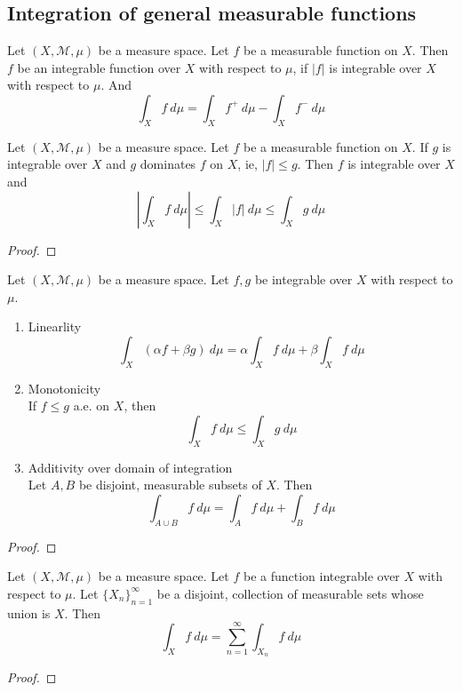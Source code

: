 \subsection{Integration of general measurable functions}
\begin{definition}
	Let $(X,\mathcal{M},\mu)$ be a measure space.
	Let $f$ be a measurable function on $X$.
	Then $f$ be an integrable function over $X$ with respect to $\mu$, if $|f|$ is integrable over $X$ with respect to $\mu$.
	And
	$$ \int_X f \ d\mu = \int_X f^+ \ d\mu - \int_X f^- \ d\mu $$
\end{definition}

\begin{theorem}
	Let $(X,\mathcal{M},\mu)$ be a measure space.
	Let $f$ be a measurable function on $X$.
	If $g$ is integrable over $X$ and $g$ dominates $f$ on $X$, ie, $|f| \le g$.
	Then $f$ is integrable over $X$ and 
	$$ \left| \int_X f \ d\mu \right| \le \int_X |f| \ d\mu \le \int_X g \ d\mu $$
\end{theorem}
\begin{proof}
\end{proof}

\begin{theorem}
	Let $(X,\mathcal{M},\mu)$ be a measure space.
	Let $f,g$ be integrable over $X$ with respect to $\mu$.
	\begin{enumerate}
		\item Linearlity \\
			$$ \int_X (\alpha f + \beta g) \ d\mu = \alpha \int_X f \ d\mu + \beta \int_X f \ d\mu $$
		\item Monotonicity \\
			If $f \le g$ a.e. on $X$, then
			$$ \int_X f \ d\mu \le \int_X g \ d\mu $$
		\item Additivity over domain of integration \\
			Let $A,B$ be disjoint, measurable subsets of $X$. Then
			$$ \int_{A \cup B} f \ d\mu = \int_A f \ d\mu + \int_B f \ d\mu $$
	\end{enumerate}
\end{theorem}
\begin{proof}
\end{proof}

\begin{theorem}
	Let $(X,\mathcal{M},\mu)$ be a measure space.
	Let $f$ be a function integrable over $X$ with respect to $\mu$.
	Let $\{ X_n \}_{n = 1}^\infty $ be a disjoint, collection of measurable sets whose union is $X$.
	Then
	$$ \int_X f \ d\mu = \sum_{n=1}^\infty \int_{X_n} f \ d\mu $$
\end{theorem}
\begin{proof}
\end{proof}

